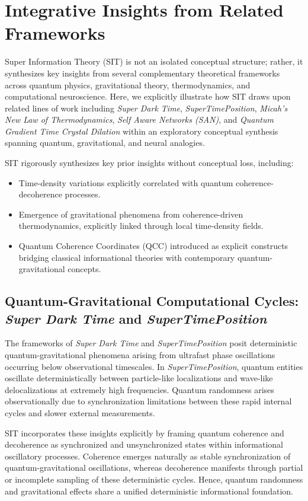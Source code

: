 \section{Integrative Insights from Related Frameworks}

Super Information Theory (SIT) is not an isolated conceptual structure; rather, it synthesizes key insights from several complementary theoretical frameworks across quantum physics, gravitational theory, thermodynamics, and computational neuroscience. Here, we explicitly illustrate how SIT draws upon related lines of work including \textit{Super Dark Time}, \textit{SuperTimePosition}, \textit{Micah's New Law of Thermodynamics}, \textit{Self Aware Networks (SAN)}, and \textit{Quantum Gradient Time Crystal Dilation} within an exploratory conceptual synthesis spanning quantum, gravitational, and neural analogies.

SIT rigorously synthesizes key prior insights without conceptual loss, including:

\begin{itemize}
\item Time-density variations explicitly correlated with quantum coherence-decoherence processes.
\item Emergence of gravitational phenomena from coherence-driven thermodynamics, explicitly linked through local time-density fields.
\item Quantum Coherence Coordinates (QCC) introduced as explicit constructs bridging classical informational theories with contemporary quantum-gravitational concepts.
\end{itemize}

\subsection{Quantum-Gravitational Computational Cycles: \textit{Super Dark Time} and \textit{SuperTimePosition}}

The frameworks of \textit{Super Dark Time} and \textit{SuperTimePosition} posit deterministic quantum-gravitational phenomena arising from ultrafast phase oscillations occurring below observational timescales. In \textit{SuperTimePosition}, quantum entities oscillate deterministically between particle-like localizations and wave-like delocalizations at extremely high frequencies. Quantum randomness arises observationally due to synchronization limitations between these rapid internal cycles and slower external measurements.

SIT incorporates these insights explicitly by framing quantum coherence and decoherence as synchronized and unsynchronized states within informational oscillatory processes. Coherence emerges naturally as stable synchronization of quantum-gravitational oscillations, whereas decoherence manifests through partial or incomplete sampling of these deterministic cycles. Hence, quantum randomness and gravitational effects share a unified deterministic informational foundation.

